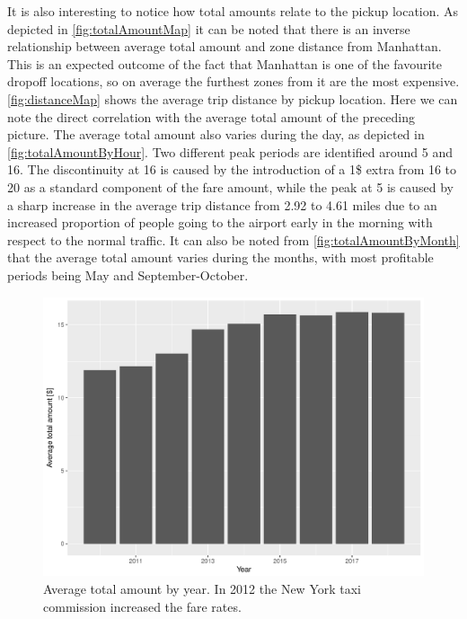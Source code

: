 \documentclass{acm_proc_article-sp-sigmod09}
\begin{document}
It is also interesting to notice how total amounts relate to the pickup location. As depicted in \cref{fig:totalAmountMap} it can be noted that there is an inverse relationship between average total amount and zone distance from Manhattan. This is an expected outcome of the fact that Manhattan is one of the favourite dropoff locations, so on average the furthest zones from it are the most expensive. \cref{fig:distanceMap} shows the average trip distance by pickup location. Here we can note the direct correlation with the average total amount of the preceding picture. The average total amount also varies during the day, as depicted in \cref{fig:totalAmountByHour}. Two different peak periods are identified around 5 and 16. The discontinuity at 16 is caused by the introduction of a 1\$ extra from 16 to 20 as a standard component of the fare amount, while the peak at 5 is caused by a sharp increase in the average trip distance from 2.92 to 4.61 miles due to an increased proportion of people going to the airport early in the morning with respect to the normal traffic. It can also be noted from \cref{fig:totalAmountByMonth} that the average total amount varies during the months, with most profitable periods being May and September-October.

\begin{figure}
	\centering
	\includegraphics[width=1\columnwidth]{resources/base_plots/avg_total_amount_by_year.pdf}
	\caption{Average total amount by year. In 2012 the New York taxi commission increased the fare rates.}
	\label{fig:totalAmountByYear}
\end{figure}
\end{document}
